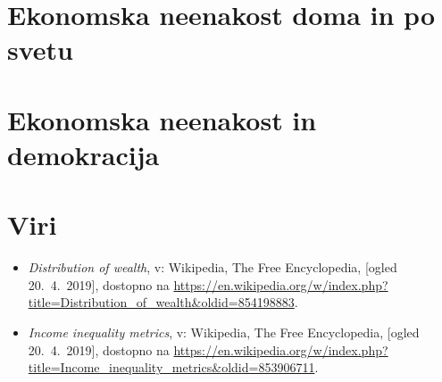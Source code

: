 \documentclass[a4paper,12 pt]{article}
\begin{document}
\newpage

\section[Ekonomska neenakost doma in po svetu]{Ekonomska neenakost doma in po svetu}

\newpage

\section[Ekonomska neenakost in demokracija]{Ekonomska neenakost in demokracija}

\newpage

\section[Viri]{Viri}

\begin{itemize}
\item 
\label{Razdelitev bogastva}
\emph{Distribution of wealth}, v: Wikipedia, The Free Encyclopedia, [ogled 20.~4.~2019], dostopno na \url{https://en.wikipedia.org/w/index.php?title=Distribution_of_wealth&oldid=854198883}.

\item 
\label{Metrike ekonomske neenakosti}
\emph{Income inequality metrics}, v: Wikipedia, The Free Encyclopedia, [ogled 20.~4.~2019], dostopno na \url{https://en.wikipedia.org/w/index.php?title=Income_inequality_metrics&oldid=853906711}.
\end{itemize}
\end{document}
